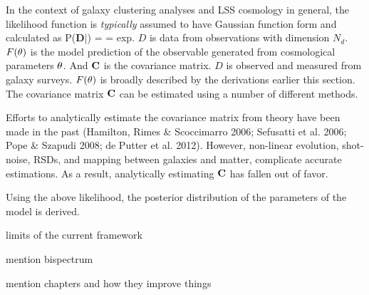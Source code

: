 In the context of galaxy clustering analyses and LSS cosmology in general, the likelihood 
function is {\em typically} assumed to have Gaussian function form and calculated as 
\beq
P({\bf D}|{\bf \theta}) =  = \; {\rm exp}.
\eeq
$D$ is data from observations with dimension $N_d$. $F({\bf \theta})$ is the model prediction 
of the observable generated from cosmological parameters ${\bf \theta}$. And ${\bf C}$ is 
the covariance matrix. $D$ is observed and measured from galaxy surveys. $F({\bf \theta})$
is broadly described by the derivations earlier this section. The covariance matrix ${\bf C}$
can be estimated using a number of different methods. 

Efforts to analytically estimate the covariance matrix from theory have been made in the past
(Hamilton, Rimes & Scoccimarro 2006; Sefusatti et al. 2006; Pope & Szapudi 2008; de Putter et al. 2012). 
However, non-linear evolution, shot-noise, RSDs, and mapping between 
galaxies and matter, complicate accurate estimations. 
As a result, analytically estimating ${\bf C}$ has fallen out of favor.

Using the above likelihood, the posterior distribution of the parameters
of the model is derived.  


\begin{enumerate}
{\item 
limits of the current framework
}
{\item 
mention bispectrum
}
{\item 
mention chapters and how they improve things
}
\end{enumerate}


